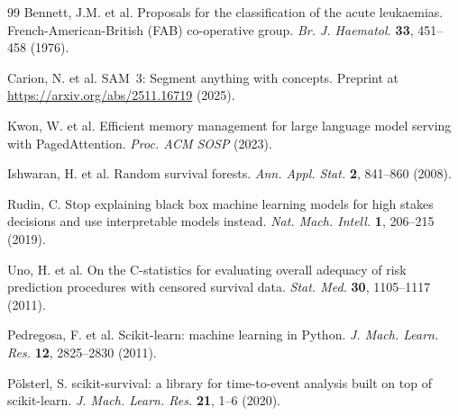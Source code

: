 \documentclass[pdflatex,sn-nature]{sn-jnl}
\begin{document}
\begin{thebibliography}{99}
Bennett, J.M. et al.
Proposals for the classification of the acute leukaemias.
French-American-British (FAB) co-operative group.
\textit{Br. J. Haematol.} \textbf{33}, 451--458 (1976).

Carion, N. et al.
SAM~3: Segment anything with concepts.
Preprint at \url{https://arxiv.org/abs/2511.16719} (2025).

Kwon, W. et al.
Efficient memory management for large language model serving with
PagedAttention.
\textit{Proc. ACM SOSP} (2023).

Ishwaran, H. et al.
Random survival forests.
\textit{Ann. Appl. Stat.} \textbf{2}, 841--860 (2008).

Rudin, C.
Stop explaining black box machine learning models for high stakes
decisions and use interpretable models instead.
\textit{Nat. Mach. Intell.} \textbf{1}, 206--215 (2019).

Uno, H. et al.
On the C-statistics for evaluating overall adequacy of risk prediction
procedures with censored survival data.
\textit{Stat. Med.} \textbf{30}, 1105--1117 (2011).

Pedregosa, F. et al.
Scikit-learn: machine learning in Python.
\textit{J. Mach. Learn. Res.} \textbf{12}, 2825--2830 (2011).

P\"olsterl, S.
scikit-survival: a library for time-to-event analysis built on top
of scikit-learn.
\textit{J. Mach. Learn. Res.} \textbf{21}, 1--6 (2020).

\end{thebibliography}
\end{document}
